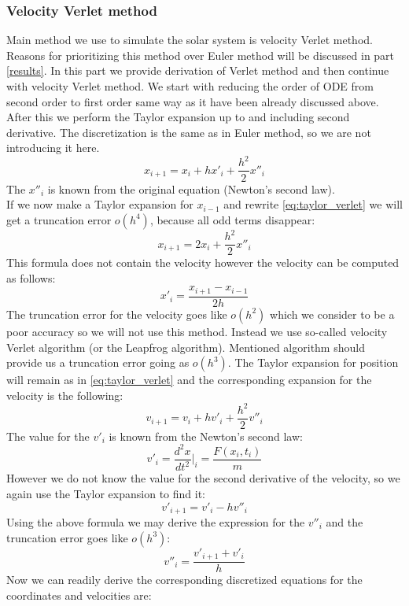 \documentclass[10pt]{article}
\begin{document}
\subsubsection{Velocity Verlet method}
Main method we use to simulate the solar system is velocity Verlet method. Reasons for prioritizing this method over Euler method will be discussed in part \ref{results}.  In this part we provide   derivation of Verlet method and then continue with velocity Verlet method. We start with reducing the order of ODE from second order to first order same way as it have been already discussed above. After this we perform the Taylor expansion up to and including second derivative. The discretization is the same as in Euler method, so we are not introducing it here.
\begin{equation}\label{eq:taylor_verlet}
x_{i+1}=x_i+hx'_i+\frac{h^2}{2}x''_i
\end{equation}
The $x''_i$ is known from the original equation (Newton's second law).\\
If we now make a Taylor expansion for $x_{i-1}$ and rewrite \ref{eq:taylor_verlet} we will get a truncation error $o(h^4)$, because all odd terms disappear: 
\[
x_{i+1}=2x_i+\frac{h^2}{2}x''_i
\]
This formula does not contain the velocity however the velocity can be computed as follows:
\[
x'_i=\frac{x_{i+1}-x_{i-1}}{2h}
\]
The truncation error for the velocity goes like $o(h^2)$ which we consider to be a poor accuracy so we will not use this method. Instead we use so-called velocity Verlet algorithm (or the Leapfrog algorithm). Mentioned algorithm should provide us a truncation error going as $o(h^3)$. The Taylor expansion for position will remain as in \ref{eq:taylor_verlet} and the corresponding expansion for the velocity is the following:
\begin{equation}
v_{i+1}=v_i+hv'_i+\frac{h^2}{2}v''_i
\end{equation}
The value for the $v'_i$ is known from the Newton's second law:
$$v'_i={\frac{d^2x}{dt^2}\Bigg|_i}=\frac{F(x_i,t_i)}{m}$$
However we do not know the value for the second derivative of the velocity, so we again use the Taylor expansion to find it:
\begin{equation}
v'_{i+1}=v'_i-hv''_i
\end{equation}
Using the above formula we may derive the expression for the $v''_i$ and the truncation error goes like $o(h^3)$:
\begin{equation}
v''_i=\frac{v'_{i+1}+v'_i}{h}
\end{equation}
Now we can readily derive the corresponding discretized equations for the coordinates and velocities are:
\end{document}
